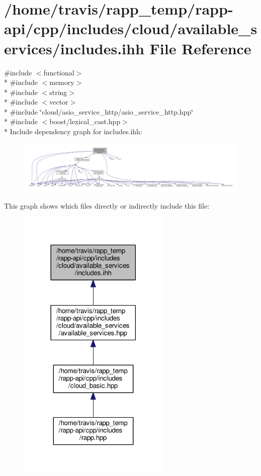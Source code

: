 \hypertarget{cloud_2available__services_2includes_8ihh}{\section{/home/travis/rapp\-\_\-temp/rapp-\/api/cpp/includes/cloud/available\-\_\-services/includes.ihh File Reference}
\label{cloud_2available__services_2includes_8ihh}
}
{\ttfamily \#include $<$functional$>$}\\*
{\ttfamily \#include $<$memory$>$}\\*
{\ttfamily \#include $<$string$>$}\\*
{\ttfamily \#include $<$vector$>$}\\*
{\ttfamily \#include \char`\"{}cloud/asio\-\_\-service\-\_\-http/asio\-\_\-service\-\_\-http.\-hpp\char`\"{}}\\*
{\ttfamily \#include $<$boost/lexical\-\_\-cast.\-hpp$>$}\\*
Include dependency graph for includes.\-ihh\-:
\nopagebreak
\begin{figure}[H]
\begin{center}
\leavevmode
\includegraphics[width=350pt]{cloud_2available__services_2includes_8ihh__incl}
\end{center}
\end{figure}
This graph shows which files directly or indirectly include this file\-:
\nopagebreak
\begin{figure}[H]
\begin{center}
\leavevmode
\includegraphics[width=206pt]{cloud_2available__services_2includes_8ihh__dep__incl}
\end{center}
\end{figure}
